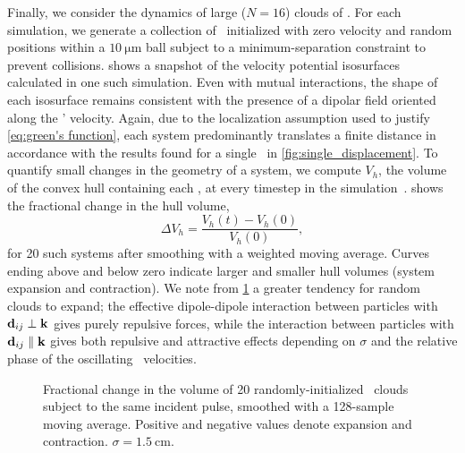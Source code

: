 Finally, we consider the dynamics of large ($N=16$) clouds of \bubbles.
For each simulation, we generate a collection of \bubbles\ initialized with zero velocity and random positions within a $\SI{10}{\micro\meter}$ ball subject to a minimum-separation constraint to prevent collisions.
 shows a snapshot of the velocity potential isosurfaces calculated in one such simulation. Even with mutual interactions, the shape of each isosurface remains consistent with the presence of a dipolar field oriented along the \bubbles' velocity.
Again, due to the localization assumption used to justify \cref{eq:green's function}, each system predominantly translates a finite distance in accordance with the results found for a single \bubble\ in \cref{fig:single_displacement}.
To quantify small changes in the geometry of a system, we compute $V_h$, the volume of the convex hull containing each \bubble, at every timestep in the simulation~\cite{SciPy}.
 shows the fractional change in the hull volume,
\begin{equation}
  \Delta V_h = \frac{V_h(t) - V_h(0)}{V_h(0)},
\end{equation}
for 20 such systems after smoothing with a weighted moving average.
Curves ending above and below zero indicate larger and smaller hull volumes (system expansion and contraction).
We note from \cref{fig:hull change} a greater tendency for random clouds to expand; the effective dipole-dipole interaction between particles with $\vb{d}_{ij} \perp \vb{k}$ gives purely repulsive forces, while the interaction between particles with $\vb{d}_{ij} \parallel \vb{k}$ gives both repulsive and attractive effects depending on $\sigma$ and the relative phase of the oscillating \bubble\ velocities.

\begin{figure}
  \centering
  \caption{\label{fig:hull change}
    Fractional change in the volume of 20 randomly-initialized \bubble\ clouds subject to the same incident pulse, smoothed with a 128-sample moving average.
    Positive and negative values denote expansion and contraction. $\sigma = \SI{1.5}{\centi\meter}$.
  }
\end{figure}
